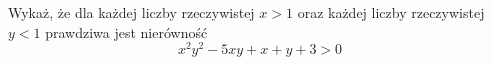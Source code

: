 Wykaż, że dla każdej liczby rzeczywistej $x>1$ oraz każdej liczby rzeczywistej $y<1$ prawdziwa jest nierówność 
\[
	x^{2}y^{2}-5xy+x+y+3>0
\]